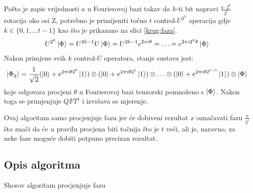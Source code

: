 Pošto je zapis vrijednosti $a$ u Fourierovoj bazi takav da $k$-ti bit napravi $\frac{a\cdot 2^k}{2^t}$ rotacija oko osi Z, potrebno je primijeniti točno $t$ control-$U^{2^k}$ operacija gdje $k \in \{0, 1,\ldots t - 1\}$ kao što je prikazano na slici \ref{krug:faza}.
\[
U^{2^k}\ket{\Phi} = U^{2k-1}U\ket{\Phi} = U^{2k-1}e^{2\pi i\theta} = \ldots = e^{2\pi i 2^k\theta}\ket{\Phi}
\]
Nakon primjene svih $k$ control-$U$ operatora, stanje sustava jest:
\[
\ket{\Phi_2} = \frac{1}{\sqrt{2}}
(\ket{0}+e^{2\pi i\theta 2^0}\ket{1})\otimes
(\ket{0}+e^{2\pi i\theta 2^1}\ket{1})\otimes
\ldots \otimes
(\ket{0}+e^{2\pi i\theta 2^{t-1}}\ket{1}) \otimes
\ket{\Phi}
\]
koje odgovara procjeni $\theta$ u Fourierovoj bazi tenzorski pomnoženo s $\ket{\Phi}$. Nakon toga se primjenjuje $QFT^{\dagger}$ i izvršava se mjerenje.

Ovaj algoritam samo procjenjuje fazu jer će dobiveni rezultat $x$ označavati fazu $\frac{x}{2^t}$ što znači da će u pravilu procjena biti točnija što je $t$ veći, ali je, naravno, za neke faze moguće dobiti potpuno precizan rezultat.

\subsection{Opis algoritma}

Shorov algoritam procjenjuje fazu





































